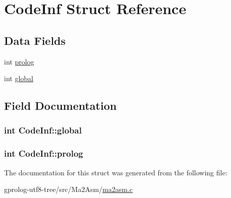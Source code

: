 \hypertarget{structCodeInf}{}\section{Code\+Inf Struct Reference}
\label{structCodeInf}
\subsection*{Data Fields}
\begin{DoxyCompactItemize}
\item 
int \hyperlink{structCodeInf_a1010280a1eff3f13adae9b219d07c4cb}{prolog}
\item 
int \hyperlink{structCodeInf_a0819cfe0da8345734d7e3b6964caf566}{global}
\end{DoxyCompactItemize}


\subsection{Field Documentation}
\subsubsection[{\texorpdfstring{global}{global}}]{\setlength{\rightskip}{0pt plus 5cm}int Code\+Inf\+::global}\hypertarget{structCodeInf_a0819cfe0da8345734d7e3b6964caf566}{}\label{structCodeInf_a0819cfe0da8345734d7e3b6964caf566}
\subsubsection[{\texorpdfstring{prolog}{prolog}}]{\setlength{\rightskip}{0pt plus 5cm}int Code\+Inf\+::prolog}\hypertarget{structCodeInf_a1010280a1eff3f13adae9b219d07c4cb}{}\label{structCodeInf_a1010280a1eff3f13adae9b219d07c4cb}


The documentation for this struct was generated from the following file\+:\begin{DoxyCompactItemize}
\item 
gprolog-\/utf8-\/tree/src/\+Ma2\+Asm/\hyperlink{ma2asm_8c}{ma2asm.\+c}\end{DoxyCompactItemize}
